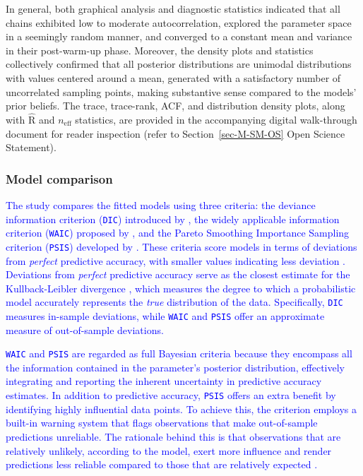 \documentclass[
  authoryear,
  preprint,
  1p]{elsarticle}
\begin{document}
In general, both graphical analysis and diagnostic statistics indicated
that all chains exhibited low to moderate autocorrelation, explored the
parameter space in a seemingly random manner, and converged to a
constant mean and variance in their post-warm-up phase. Moreover, the
density plots and statistics collectively confirmed that all posterior
distributions are unimodal distributions with values centered around a
mean, generated with a satisfactory number of uncorrelated sampling
points, making substantive sense compared to the models' prior beliefs.
The trace, trace-rank, ACF, and distribution density plots, along with
\(\widehat{\text{R}}\) and \(n_{\text{eff}}\) statistics, are provided
in the accompanying digital walk-through document for reader inspection
(refer to Section~\ref{sec-M-SM-OS} Open Science Statement).

\subsubsection{Model comparison}\label{sec-M-SM-MC}

\textcolor{blue}{The study compares the fitted models using three criteria: the deviance
information criterion (\texttt{DIC}) introduced by
\citet{Spiegelhalter_et_al_2002}, the widely applicable information
criterion (\texttt{WAIC}) proposed by \citet{Watanabe_2013}, and the
Pareto Smoothing Importance Sampling criterion (\texttt{PSIS}) developed
by \citet{Vehtari_et_al_2017}. These criteria score models in terms of
deviations from \emph{perfect} predictive accuracy, with smaller values
indicating less deviation \citep{McElreath_2020}. Deviations from
\emph{perfect} predictive accuracy serve as the closest estimate for the
Kullback-Leibler divergence \citep{Kullback_et_al_1951}, which measures
the degree to which a probabilistic model accurately represents the
\emph{true} distribution of the data. Specifically, \texttt{DIC}
measures in-sample deviations, while \texttt{WAIC} and \texttt{PSIS}
offer an approximate measure of out-of-sample deviations.}

\textcolor{blue}{\texttt{WAIC} and \texttt{PSIS} are regarded as full Bayesian criteria
because they encompass all the information contained in the parameter's
posterior distribution, effectively integrating and reporting the
inherent uncertainty in predictive accuracy estimates. In addition to
predictive accuracy, \texttt{PSIS} offers an extra benefit by
identifying highly influential data points. To achieve this, the
criterion employs a built-in warning system that flags observations that
make out-of-sample predictions unreliable. The rationale behind this is
that observations that are relatively unlikely, according to the model,
exert more influence and render predictions less reliable compared to
those that are relatively expected \citep{McElreath_2020}.}
\end{document}

